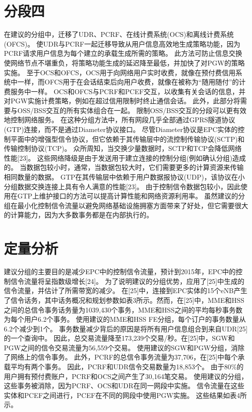 \section{分段四}
在建议的分组中，迁移了UDR、PCRF、在线计费系统(OCS)和离线计费系统(OFCS)。
使UDR与PCRF一起迁移导致从用户信息高效地生成策略功能，因为PCRF请求用户信息为每个建立的承载生成所需的策略。
此方法可防止信息交换使网络节点不堪重负，将策略功能生成的延迟降至最低，并加快了对PGW的策略实施。
至于OCS和OFCS，OCS用于向网络用户实时收费，就像在预付费信用系统中一样，而OFCS用于在会话结束后向用户收费，就像在被称为“随用随付”的计费服务中一样。
OCS和OFCS与PCRF和PCEF交互，以收集有关会话的信息，并对PGW实施计费策略，例如在超过信用限制时终止通信会话。
此外，此部分将需要与OSS/BSS交互的所有实体组合在一起。
限制OSS/BSS交互的分段可以更有效地控制网络服务。
在这种分组方法中，所有网段几乎全部通过GPRS隧道协议(GTP)连接，而不是通过Diameter协议接口。
尽管Diameter协议是EPC实体的控制平面中的增强型信令协议，但它依赖于其传输层中的流控制传输协议(SCTP)和传输控制协议(TCP)。
众所周知，当交换少量数据时，SCTP和TCP会降低网络性能[23]。
这些网络降级是由于发送用于建立连接的控制分组(例如确认分组)造成的。
当数据包较小时，通常，当数据包较大时，它们需要更多的计算资源来传输相同数量的数据。
GTP在其传输层中依赖于用户数据报协议(UDP)，该协议在小分组数据交换连接上具有令人满意的性能[23]。
由于控制信令数据包较小，因此使用在GTP上维护接口的方法可以提高计算性能和网络资源利用率。
虽然建议的分组在最小化控制信令流量以避免网络基础设施拥塞方面带来了好处，但它需要很大的计算能力，因为大多数事务都是在内部执行的。

\section{定量分析}
建议分组的主要目的是减少EPC中的控制信令流量，预计到2015年，EPC中的控制信令流量将呈指数级增长[24]。
为了说明建议的分组优势，应用了[25]中生成的信令流量，并估计了所需带宽的减少。
在[25]中，连接到EPC实体的15个eNB产生了信令话务，其中话务概况和规划参数如表3所示。然而，在[25]中，MME和HSS之间的总信令事务话务量为1039,430个事务，MME和HSS之间的平均每秒事务数为每个用户6.2个事务。
使用建议的MME和HSS FE分组，每个订户的事务数量从6.2个减少到1个。
事务数量减少背后的原因是将所有用户信息组合到来自UDR[25]的一个查询中。
因此，总交易流量降至173,239个交易/秒。在[25]中，SGW和PGW之间的信令交易流量为56,559个交易。
使用建议的SGW和PGW分组，消除了网络上的信令事务。
此外，PCRF的总信令事务流量为37,706，在[25]中每个承载平均有两个事务。
因此，PCRF和UDR信令交易数量为18,853个。
由于80\%的用户拥有预付费账户，PCRF和OCS之间产生了30,164笔交易。
使用建议的分组，这些事务被消除，因为PCRF、OCS和UDR在同一网段中实施。
信令流量在这些实体和PCEF之间进行，PCEF在不同的网段中使用PGW实施。
这些结果如表4所示。